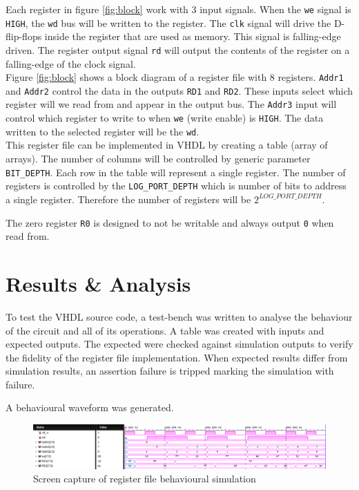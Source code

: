 \documentclass[CMPE]{../KGCOEReport}
\def\code#1{\texttt{#1}}
\begin{document}
	Each register in figure \ref{fig:block} work with 3 input signals. When
	the \code {we} signal is \code{HIGH}, the \code{wd} bus will be written to
	the register. The \code {clk} signal will drive the D-flip-flops inside the
	register that are used as memory. This signal is falling-edge driven.
	The register output signal \code{rd} will output the contents of the register
	on a falling-edge of the clock signal.    
\\

    Figure \ref{fig:block} shows a block diagram of a register file with 8 registers. \code{Addr1} and \code{Addr2} control the data in the outputs
    \code{RD1} and \code{RD2}.
    These inputs select which register will we read from and appear in the output
    bus.
    The \code{Addr3} input will control which register to write to when \code{we}
    (write enable) is \code{HIGH}.
    The data written to the selected register will be the \code{wd}.
\\ 
 
    This register file can be implemented in VHDL by creating a table
    (array of arrays).
    The number of columns will be controlled by generic parameter
    \code{BIT\_DEPTH}.
    Each row in the table will represent a single register.
    The number of registers is controlled by the \code{LOG\_PORT\_DEPTH} which is
    number of bits to address a single register.
    Therefore the number of registers will be $2^{LOG\_PORT\_DEPTH}$.
    
    The zero register \code{R0} is designed to not be writable and always output
    \code{0} when read from.

    \section*{Results \& Analysis}
    To test the VHDL source code, a test-bench was written to analyse the 
    behaviour of the circuit and all of its operations. A table was created
    with inputs and expected outputs. The expected were checked against simulation
    outputs to verify the fidelity of the register file implementation.
    When expected results differ from simulation results, an assertion failure
    is tripped marking the simulation with failure.

    A behavioural waveform was generated.

    \begin{figure}[h!]
        \centering
        \includegraphics[width=\textwidth]{img/behaviour}
        \caption{Screen capture of register file behavioural simulation}
        \label{fig:behave}
    \end{figure}
\end{document}

